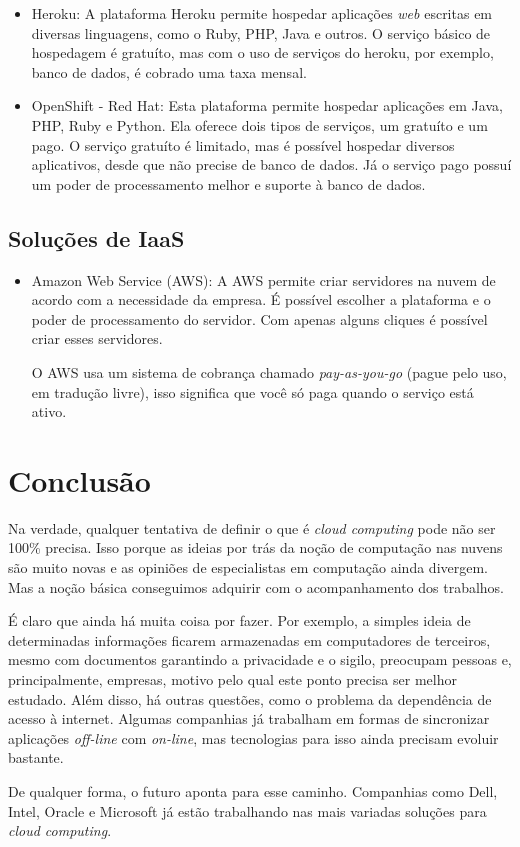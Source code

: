 \documentclass{abnt}
\begin{document}
		\begin{itemize}
			\item Heroku: A plataforma Heroku permite hospedar aplicações \textit{web} escritas em diversas linguagens, como o Ruby, PHP, Java e outros. O serviço básico de hospedagem é gratuíto, mas com o uso de serviços do heroku, por exemplo, banco de dados, é cobrado uma taxa mensal.
			\item OpenShift - Red Hat: Esta plataforma permite hospedar aplicações em Java, PHP, Ruby e Python. Ela oferece dois tipos de serviços, um gratuíto e um pago. O serviço gratuíto é limitado, mas é possível hospedar diversos aplicativos, desde que não precise de banco de dados. Já o serviço pago possuí um poder de processamento melhor e suporte à banco de dados.
		\end{itemize}

	\section{Soluções de IaaS}

		\begin{itemize}
			\item Amazon Web Service (AWS): A AWS permite criar servidores na nuvem de acordo com a necessidade da empresa. É possível escolher a plataforma e o poder de processamento do servidor. Com apenas alguns cliques é possível criar esses servidores. 
			
			O AWS usa um sistema de cobrança chamado \textit{pay-as-you-go} (pague pelo uso, em tradução livre), isso significa que você só paga quando o serviço está ativo.
		\end{itemize}
	
	\chapter{Conclusão}
	
	Na verdade, qualquer tentativa de definir o que é \textit{cloud computing} pode não ser 100\% precisa. Isso porque as 
	ideias por trás da noção de computação nas nuvens são muito novas e as opiniões de especialistas em computação 
	ainda divergem. Mas a noção básica conseguimos adquirir com o acompanhamento dos trabalhos.
	
	É claro que ainda há muita coisa por fazer. Por exemplo, a simples ideia de determinadas informações ficarem 
	armazenadas em computadores de terceiros, mesmo com documentos garantindo a privacidade e o sigilo, 
	preocupam pessoas e, principalmente, empresas, motivo pelo qual este ponto precisa ser melhor estudado. 
	Além disso, há outras questões, como o problema da dependência de acesso à internet. Algumas companhias já 
	trabalham em formas de sincronizar aplicações \textit{off-line} com \textit{on-line}, mas tecnologias para isso ainda precisam 
	evoluir bastante.
	
	De qualquer forma, o futuro aponta para esse caminho. Companhias como Dell, Intel, Oracle e 
	Microsoft já estão trabalhando nas mais variadas soluções para \textit{cloud computing}.
	
\end{document}
